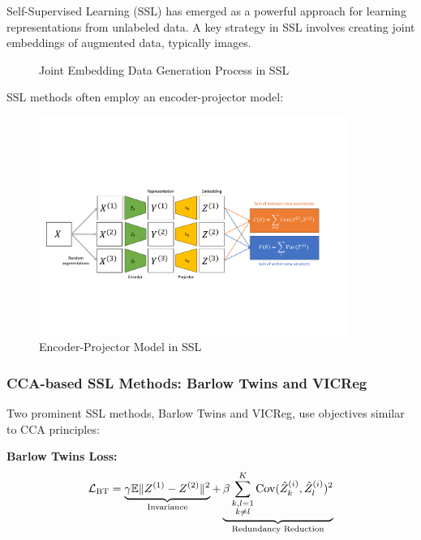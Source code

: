Self-Supervised Learning (SSL) has emerged as a powerful approach for learning representations from unlabeled data. A key strategy in SSL involves creating joint embeddings of augmented data, typically images.

\begin{figure}
\centering
{}
\caption{Joint Embedding Data Generation Process in SSL}
\label{fig:joint_embedding}
\end{figure}

SSL methods often employ an encoder-projector model:

\begin{figure}
\centering
\includegraphics[width=0.9\textwidth]{figures/ssl_schematic}
\caption{Encoder-Projector Model in SSL}
\label{fig:sslschematic}
\end{figure}

\subsubsection{CCA-based SSL Methods: Barlow Twins and VICReg}
Two prominent SSL methods, Barlow Twins and VICReg, use objectives similar to CCA principles:

\textbf{Barlow Twins Loss:}
\begin{equation}
\mathcal{L}_\text{BT} = \underbrace{\gamma \mathbb{E} \lVert Z^{(1)} - Z^{(2)}\rVert^2}_{\text{Invariance}} + \underbrace{\beta \sum_{\substack{k,l=1 \\ k \neq l}}^K \mathrm{Cov}(\hat{Z}^{(i)}_k, \hat{Z}^{(i)}_l)^2}_{\text{Redundancy Reduction}}
\end{equation}

